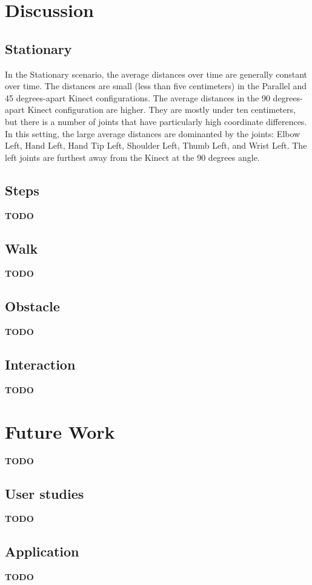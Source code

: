 \section{Discussion}

\subsection{Stationary}

In the Stationary scenario, the average distances over time are generally constant over time. The distances are small (less than five centimeters) in the Parallel and 45 degrees-apart Kinect configurations. The average distances in the 90 degrees-apart Kinect configuration are higher. They are mostly under ten centimeters, but there is a number of joints that have particularly high coordinate differences. In this setting, the large average distances are dominanted by the joints: Elbow Left, Hand Left, Hand Tip Left, Shoulder Left, Thumb Left, and Wrist Left. The left joints are furthest away from the Kinect at the 90 degrees angle.

\subsection{Steps}

\textbf{TODO}

\subsection{Walk}

\textbf{TODO}

\subsection{Obstacle}

\textbf{TODO}

\subsection{Interaction}

\textbf{TODO}

\section{Future Work}
\label{sec:future_work}

\textbf{TODO}

\subsection{User studies}

\textbf{TODO}

\subsection{Application}

\textbf{TODO}